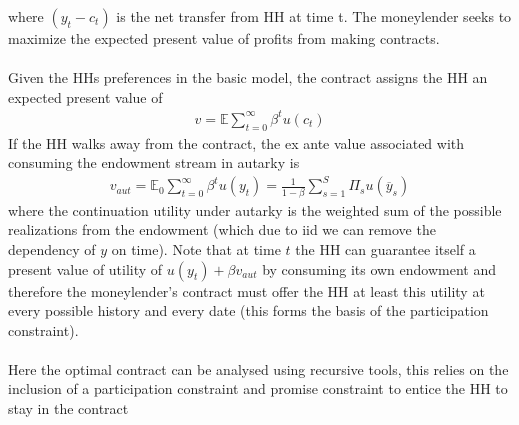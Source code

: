 \documentclass{article}
\begin{document}
where $(y_{t} - c_{t})$ is the net transfer from HH at time t. The moneylender seeks to maximize the expected present value of profits from making contracts. \\ \\
Given the HHs preferences in the basic model, the contract assigns the HH an expected present value of
\begin{gather*}
    v = \mathbb{E} \sum_{t=0}^{\infty} \beta^{t} u(c_{t})
\end{gather*}
If the HH walks away from the contract, the ex ante value associated with consuming the endowment stream in autarky is
\begin{gather*}
    v_{aut} = \mathbb{E}_{0} \sum_{t=0}^{\infty} \beta^{t} u(y_{t}) = \frac{1}{1-\beta} \sum_{s=1}^{S} \Pi_{s} u(\overline{y}_{s})
\end{gather*}
where the continuation utility under autarky is the weighted sum of the possible realizations from the endowment (which due to iid we can remove the dependency of $y$ on time). Note that at time $t$ the HH can guarantee itself a present value of utility of $u(y_{t}) + \beta v_{aut}$ by consuming its own endowment and therefore the moneylender's contract must offer the HH at least this utility at every possible history and every date (this forms the basis of the participation constraint). \\ \\
Here the optimal contract can be analysed using recursive tools, this relies on the inclusion of a participation constraint and promise constraint to entice the HH to stay in the contract
\end{document}
